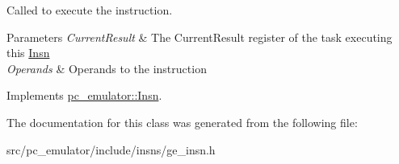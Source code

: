 Called to execute the instruction. 


\begin{DoxyParams}{Parameters}
{\em Current\+Result} & The Current\+Result register of the task executing this \hyperlink{classpc__emulator_1_1Insn}{Insn} \\
\hline
{\em Operands} & Operands to the instruction \\
\hline
\end{DoxyParams}


Implements \hyperlink{classpc__emulator_1_1Insn_a103d27030e872a799e313df16c1f3d66}{pc\+\_\+emulator\+::\+Insn}.



The documentation for this class was generated from the following file\+:\begin{DoxyCompactItemize}
\item 
src/pc\+\_\+emulator/include/insns/ge\+\_\+insn.\+h\end{DoxyCompactItemize}
